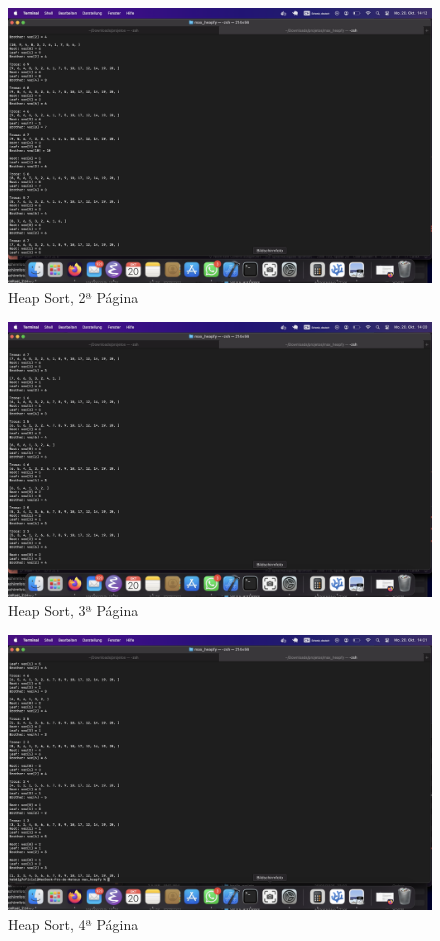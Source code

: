 \documentclass{article}
\begin{document}
    \begin{figure}
        \centering
        \includegraphics[width=1.3\linewidth]{heapsort2.png}
        \caption{Heap Sort, 2ª Página}
        \label{fig:myfig3}
    \end{figure}

    \begin{figure}
        \centering
        \includegraphics[width=1.3\linewidth]{heapsort3.png}
        \caption{Heap Sort, 3ª Página}
        \label{fig:myfig4}
    \end{figure}

    \begin{figure}
        \centering
        \includegraphics[width=1.3\linewidth]{heapsort4.png}
        \caption{Heap Sort, 4ª Página}
        \label{fig:myfig5}
    \end{figure}
\end{document}
